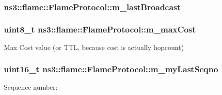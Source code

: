 \subsubsection[{\texorpdfstring{m\+\_\+last\+Broadcast}{m_lastBroadcast}}]{ ns3\+::flame\+::\+Flame\+Protocol\+::m\+\_\+last\+Broadcast\hspace{0.3cm}{\ttfamily [private]}}\hypertarget{classns3_1_1flame_1_1FlameProtocol_a9ea666e71f74654772318563e939df7f}{}\label{classns3_1_1flame_1_1FlameProtocol_a9ea666e71f74654772318563e939df7f}
\subsubsection[{\texorpdfstring{m\+\_\+max\+Cost}{m_maxCost}}]{\setlength{\rightskip}{0pt plus 5cm}uint8\+\_\+t ns3\+::flame\+::\+Flame\+Protocol\+::m\+\_\+max\+Cost\hspace{0.3cm}{\ttfamily [private]}}\hypertarget{classns3_1_1flame_1_1FlameProtocol_a858e22014925c21b3773fdf414ff3064}{}\label{classns3_1_1flame_1_1FlameProtocol_a858e22014925c21b3773fdf414ff3064}


Max Cost value (or T\+TL, because cost is actually hopcount) 

\subsubsection[{\texorpdfstring{m\+\_\+my\+Last\+Seqno}{m_myLastSeqno}}]{\setlength{\rightskip}{0pt plus 5cm}uint16\+\_\+t ns3\+::flame\+::\+Flame\+Protocol\+::m\+\_\+my\+Last\+Seqno\hspace{0.3cm}{\ttfamily [private]}}\hypertarget{classns3_1_1flame_1_1FlameProtocol_a51d2e538c9c79ad9ab1dff63a957515f}{}\label{classns3_1_1flame_1_1FlameProtocol_a51d2e538c9c79ad9ab1dff63a957515f}


Sequence number\+: 


